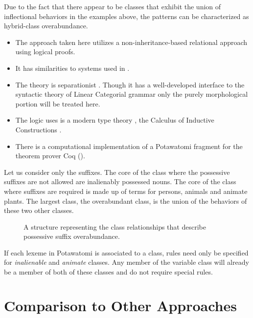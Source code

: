 Due to the fact that there appear to be classes that exhibit the union
of inflectional behaviors in the examples above, the patterns can be
characterized as hybrid-class
overabundance.

\begin{itemize}
\item The approach taken here utilizes a non-inheritance-based
  relational approach using logical proofs.
\item It has similarities to systems used in \citet{lambek1997type,
    mcconville2006inheritance}.
\item The theory is separationist \citep{beard1995lexeme,
    aronoff1994morphology, sadler2001syntax}. Though it has a
  well-developed interface to the syntactic theory of Linear
  Categorial grammar \citep{smith2010correlational,
    mihalivcek2012distinguishing, mihalicek2012serbo,
    pollard2015agnostic, martin2013dynamics, martin2014dynamic,
    worth2016english, yasavul2017questions} only the purely
  morphological portion will be treated here.
\item The logic uses is a modern type theory
  \citep{martinlof1984intuitionistic}, the Calculus of Inductive
  Constructions \citep{coquand1988calculus, luo1990extended,
    coquand1990inductively}.
\item There is a computational implementation of a Potawatomi fragment
  for the theorem prover Coq ().
\end{itemize}

Let us consider only the suffixes. The core of the class where the
possessive suffixes are not allowed are inalienably possessed
nouns. The core of the class where suffixes are required is made up of
terms for persons, animals and animate plants. The largest class, the
overabundant class, is the union of the behaviors of these two other
classes.

\begin{figure}[H]
  \centering
  
  \caption{A structure representing the class relationships that
    describe possessive suffix overabundance.}
  \label{dpoles}
\end{figure}

If each lexeme in Potawatomi is associated to a class, rules need only
be specified for {\it inalienable} and {\it animate} classes. Any
member of the variable class will already be a member of both of these
classes and do not require special rules.

\section{Comparison to Other Approaches}


